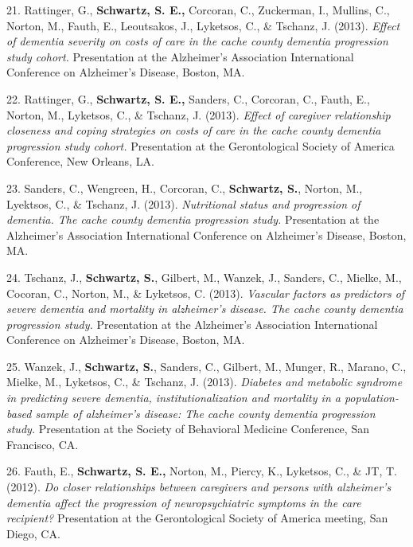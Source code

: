 \documentclass[11pt,a4paper,]{moderncv}
\newlength{\cslhangindent}
\newenvironment{CSLReferences}[2] %
 {\begin{list}{}{%
  \setlength{\itemindent}{0pt}
  \setlength{\leftmargin}{0pt}
  \setlength{\parsep}{0pt}
  \ifodd #1
   \setlength{\leftmargin}{\cslhangindent}
   \setlength{\itemindent}{-1\cslhangindent}
  \fi
  \setlength{\itemsep}{#2\baselineskip}}}
 {\end{list}}
\begin{document}
\begin{CSLReferences}{1}{0}
21. Rattinger, G., \textbf{Schwartz, S. E.,} Corcoran, C., Zuckerman,
I., Mullins, C., Norton, M., Fauth, E., Leoutsakos, J., Lyketsos, C., \&
Tschanz, J. (2013). \emph{Effect of dementia severity on costs of care
in the cache county dementia progression study cohort.} Presentation at
the Alzheimer's Association International Conference on Alzheimer's
Disease, Boston, MA.

22. Rattinger, G., \textbf{Schwartz, S. E.,} Sanders, C., Corcoran, C.,
Fauth, E., Norton, M., Lyketsos, C., \& Tschanz, J. (2013). \emph{Effect
of caregiver relationship closeness and coping strategies on costs of
care in the cache county dementia progression study cohort.}
Presentation at the Gerontological Society of America Conference, New
Orleans, LA.

23. Sanders, C., Wengreen, H., Corcoran, C., \textbf{Schwartz, S.},
Norton, M., Lyektsos, C., \& Tschanz, J. (2013). \emph{Nutritional
status and progression of dementia. The cache county dementia
progression study.} Presentation at the Alzheimer's Association
International Conference on Alzheimer's Disease, Boston, MA.

24. Tschanz, J., \textbf{Schwartz, S.}, Gilbert, M., Wanzek, J.,
Sanders, C., Mielke, M., Cocoran, C., Norton, M., \& Lyketsos, C.
(2013). \emph{Vascular factors as predictors of severe dementia and
mortality in alzheimer's disease. The cache county dementia progression
study.} Presentation at the Alzheimer's Association International
Conference on Alzheimer's Disease, Boston, MA.

25. Wanzek, J., \textbf{Schwartz, S.}, Sanders, C., Gilbert, M., Munger,
R., Marano, C., Mielke, M., Lyketsos, C., \& Tschanz, J. (2013).
\emph{Diabetes and metabolic syndrome in predicting severe dementia,
institutionalization and mortality in a population-based sample of
alzheimer's disease: The cache county dementia progression study.}
Presentation at the Society of Behavioral Medicine Conference, San
Francisco, CA.

26. Fauth, E., \textbf{Schwartz, S. E.,} Norton, M., Piercy, K.,
Lyketsos, C., \& JT, T. (2012). \emph{Do closer relationships between
caregivers and persons with alzheimer's dementia affect the progression
of neuropsychiatric symptoms in the care recipient?} Presentation at the
Gerontological Society of America meeting, San Diego, CA.


\end{CSLReferences}
\end{document}
